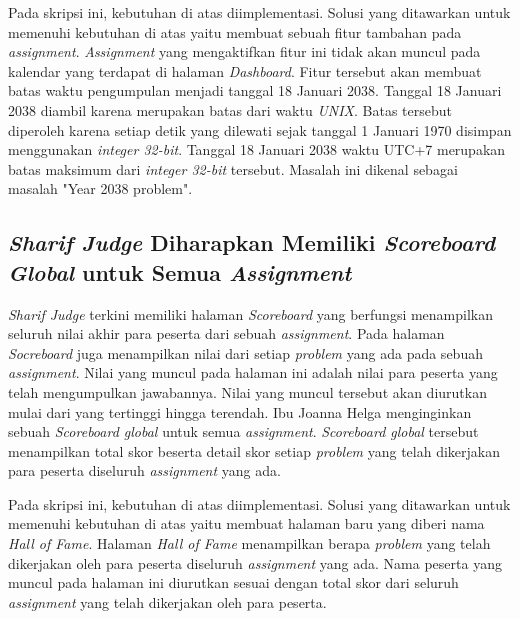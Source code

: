 Pada skripsi ini, kebutuhan di atas diimplementasi. Solusi yang ditawarkan untuk memenuhi kebutuhan di atas yaitu membuat sebuah fitur tambahan pada \textit{assignment}. \textit{Assignment} yang mengaktifkan fitur ini tidak akan muncul pada kalendar yang terdapat di halaman \textit{Dashboard}. Fitur tersebut akan membuat batas waktu pengumpulan menjadi tanggal 18 Januari 2038. Tanggal 18 Januari 2038 diambil karena merupakan batas dari waktu \textit{UNIX}. Batas tersebut diperoleh karena setiap detik yang dilewati sejak tanggal 1 Januari 1970 disimpan menggunakan \textit{integer 32-bit}. Tanggal 18 Januari 2038 waktu UTC+7 merupakan batas maksimum dari \textit{integer 32-bit} tersebut. Masalah ini dikenal sebagai masalah "Year 2038 problem". 

\subsection{\textit{Sharif Judge} Diharapkan Memiliki \textit{Scoreboard Global} untuk Semua \textit{Assignment}}
\textit{Sharif Judge} terkini memiliki halaman \textit{Scoreboard} yang berfungsi menampilkan seluruh nilai akhir para peserta dari sebuah \textit{assignment}. Pada halaman \textit{Socreboard} juga menampilkan nilai dari setiap \textit{problem} yang ada pada sebuah \textit{assignment}. Nilai yang muncul pada halaman ini adalah nilai para peserta yang telah mengumpulkan jawabannya. Nilai yang muncul tersebut akan diurutkan mulai dari yang tertinggi hingga terendah. Ibu Joanna Helga menginginkan sebuah \textit{Scoreboard global} untuk semua \textit{assignment}. \textit{Scoreboard global} tersebut menampilkan total skor beserta detail skor setiap \textit{problem} yang telah dikerjakan para peserta diseluruh \textit{assignment} yang ada. 

Pada skripsi ini, kebutuhan di atas diimplementasi. Solusi yang ditawarkan untuk memenuhi kebutuhan di atas yaitu membuat halaman baru yang diberi nama \textit{Hall of Fame}. Halaman \textit{Hall of Fame} menampilkan berapa \textit{problem} yang telah dikerjakan oleh para peserta diseluruh \textit{assignment} yang ada. Nama peserta yang muncul pada halaman ini diurutkan sesuai dengan total skor dari seluruh \textit{assignment} yang telah dikerjakan oleh para peserta.

